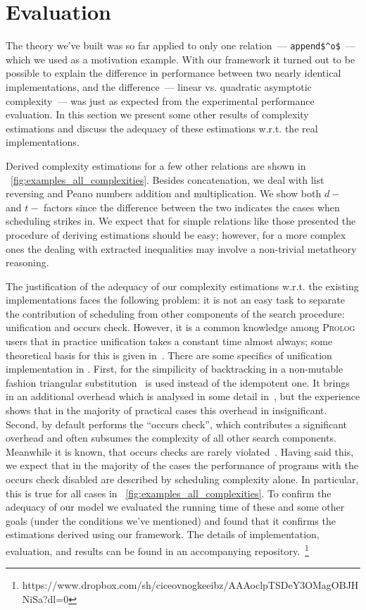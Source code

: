 \section{Evaluation}
\label{sec:evaluation}

The theory we've built was so far applied to only one relation~--- \lstinline|append$^o$|~--- which we used as a motivation example. With our framework it turned out
to be possible to explain the difference in performance between two nearly identical implementations, and the difference~--- linear vs. quadratic asymptotic
complexity~--- was just as expected from the experimental performance evaluation. In this section we present some other results of complexity estimations and
discuss the adequacy of these estimations w.r.t. the real \mK implementations.

Derived complexity estimations for a few other relations are shown in \figureword~\ref{fig:examples_all_complexities}. Besides concatenation, we deal with
list reversing and Peano numbers addition and multiplication. We show both $d-$ and $t-$ factors since the difference between the two indicates the
cases when scheduling strikes in. We expect that for simple relations like those presented the procedure of deriving estimations should be easy; however,
for a more complex ones the dealing with extracted inequalities may involve a non-trivial metatheory reasoning.

The justification of the adequacy of our complexity estimations w.r.t. the existing \mK implementations faces the following problem: it is
not an easy task to separate the contribution of scheduling from other components of the search procedure: unification and occurs check. However, it is a common
knowledge among \textsc{Prolog} users that in practice unification takes a constant time almost always; some theoretical basis for this is given in~\cite{UnificationAverageCost}.
There are some specifics of unification implementation in \mK. First, for the simpilicity of backtracking in a non-mutable fashion triangular
substitution~\cite{UnificationTheory} is used instead of the idempotent one. It brings in an additional overhead which is analysed
in some detail in~\cite{WillsThesis}, but the experience shows that in the majority of practical cases this overhead in insignificant. Second, \mK by default
performs the ``occurs check'', which contributes a significant overhead and often subsumes the complexity of all other search components. Meanwhile it is known, that occurs checks are rarely
violated~\cite{OccursCheckNotAProblem}. Having said this, we expect that in the majority of the cases the performance of \mK programs with the occurs check disabled are
described by scheduling complexity alone. In particular, this is true for all cases in \figureword~\ref{fig:examples_all_complexities}. To confirm the adequacy of
our model we evaluated the running time of these and some other goals (under the conditions we've mentioned) and found that it confirms the estimations derived
using our framework. The details of implementation, evaluation, and results can be found in an accompanying repository.~\footnote{https://www.dropbox.com/sh/ciceovnogkeeibz/AAAoclpTSDeY3OMagOBJHNiSa?dl=0}

